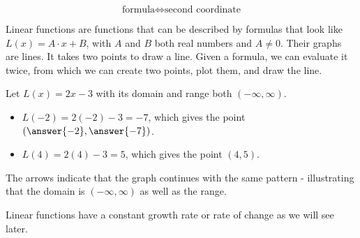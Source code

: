 \documentclass{ximera}
\begin{document}
\[ \text{formula} \iff \text{second coordinate} \]









\begin{example}

Linear functions are functions that can be described by formulas that look like $L(x) = A \cdot x + B$, with $A$ and $B$ both real numbers and $A \ne 0$.  Their graphs are lines.  It takes two points to draw a line. Given a formula, we can evaluate it twice, from which we can create two points, plot them, and draw the line.

Let $L(x) = 2x-3$ with its domain and range both $(-\infty, \infty)$.

\begin{itemize}
\item $L(-2) = 2(-2) - 3 = -7$, which gives the point $\left(\answer{-2}, \answer{-7}\right)$.
\item $L(4) = 2(4) - 3 = 5$, which gives the point $(4, 5)$.
\end{itemize}






\begin{image}
\end{image}

The arrows indicate that the graph continues with the same pattern - illustrating that the domain is $(-\infty, \infty)$ as well as the range.


\end{example}
Linear functions have a constant growth rate or rate of change as we will see later.  \\
\end{document}
